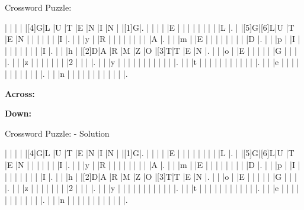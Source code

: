 \documentclass[12pt]{article}
\begin{document}
\begin{center}
  \huge{Crossword Puzzle:}
\end{center}
\vspace{1.5cm}
\begin{Puzzle}{15}{15}
  |{}  |{}  |{}  |{}  |[4]G|L   |U   |T   |E   |N   |I   |N   |{}  |[1]G|.
  |{}  |{}  |{}  |{}  |E   |{}  |{}  |{}  |{}  |{}  |{}  |{}  |{}  |L   |.
  |{}  |[5]G|[6]L|U   |T   |E   |N   |{}  |{}  |{}  |{}  |{}  |{}  |I   |.
  |{}  |{}  |y   |{}  |R   |{}  |{}  |{}  |{}  |{}  |{}  |{}  |{}  |A   |.
  |{}  |{}  |m   |{}  |E   |{}  |{}  |{}  |{}  |{}  |{}  |{}  |{}  |D   |.
  |{}  |{}  |p   |{}  |I   |{}  |{}  |{}  |{}  |{}  |{}  |{}  |{}  |I   |.
  |{}  |{}  |h   |{}  |[2]D|A   |R   |M   |Z   |O   |[3]T|T   |E   |N   |.
  |{}  |{}  |o   |{}  |E   |{}  |{}  |{}  |{}  |{}  |G   |{}  |{}  |{}  |.
  |{}  |{}  |z   |{}  |{}  |{}  |{}  |{}  |{}  |{}  |2   |{}  |{}  |{}  |.
  |{}  |{}  |y   |{}  |{}  |{}  |{}  |{}  |{}  |{}  |{}  |{}  |{}  |{}  |.
  |{}  |{}  |t   |{}  |{}  |{}  |{}  |{}  |{}  |{}  |{}  |{}  |{}  |{}  |.
  |{}  |{}  |e   |{}  |{}  |{}  |{}  |{}  |{}  |{}  |{}  |{}  |{}  |{}  |.
  |{}  |{}  |n   |{}  |{}  |{}  |{}  |{}  |{}  |{}  |{}  |{}  |{}  |{}  |.
\end{Puzzle}
\begin{PuzzleClues}{\textbf{Across:}}
\end{PuzzleClues}
\begin{PuzzleClues}{\textbf{Down:}}
\end{PuzzleClues}
\newpage
\begin{center}
  \huge{Crossword Puzzle: - Solution}
\end{center}
\vspace{1.5cm}
\PuzzleSolution
\begin{Puzzle}{15}{15}
  |{}  |{}  |{}  |{}  |[4]G|L   |U   |T   |E   |N   |I   |N   |{}  |[1]G|.
  |{}  |{}  |{}  |{}  |E   |{}  |{}  |{}  |{}  |{}  |{}  |{}  |{}  |L   |.
  |{}  |[5]G|[6]L|U   |T   |E   |N   |{}  |{}  |{}  |{}  |{}  |{}  |I   |.
  |{}  |{}  |y   |{}  |R   |{}  |{}  |{}  |{}  |{}  |{}  |{}  |{}  |A   |.
  |{}  |{}  |m   |{}  |E   |{}  |{}  |{}  |{}  |{}  |{}  |{}  |{}  |D   |.
  |{}  |{}  |p   |{}  |I   |{}  |{}  |{}  |{}  |{}  |{}  |{}  |{}  |I   |.
  |{}  |{}  |h   |{}  |[2]D|A   |R   |M   |Z   |O   |[3]T|T   |E   |N   |.
  |{}  |{}  |o   |{}  |E   |{}  |{}  |{}  |{}  |{}  |G   |{}  |{}  |{}  |.
  |{}  |{}  |z   |{}  |{}  |{}  |{}  |{}  |{}  |{}  |2   |{}  |{}  |{}  |.
  |{}  |{}  |y   |{}  |{}  |{}  |{}  |{}  |{}  |{}  |{}  |{}  |{}  |{}  |.
  |{}  |{}  |t   |{}  |{}  |{}  |{}  |{}  |{}  |{}  |{}  |{}  |{}  |{}  |.
  |{}  |{}  |e   |{}  |{}  |{}  |{}  |{}  |{}  |{}  |{}  |{}  |{}  |{}  |.
  |{}  |{}  |n   |{}  |{}  |{}  |{}  |{}  |{}  |{}  |{}  |{}  |{}  |{}  |.
\end{Puzzle}
\end{document}
